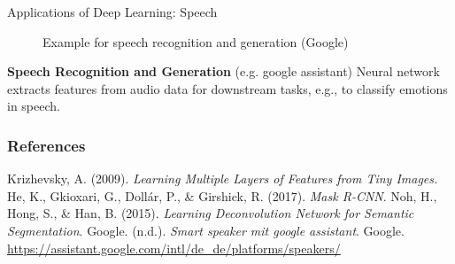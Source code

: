 \documentclass[11pt,compress,t,notes=noshow, xcolor=table]{beamer}
\begin{document}
\begin{frame} {Applications of Deep Learning: Speech}
\begin{figure}
\centering
{}
\caption{Example for speech recognition and generation (Google)}
\end{figure}
\textbf{Speech Recognition and Generation} (e.g. google assistant)
Neural network extracts features from audio data for downstream tasks, e.g., to classify emotions in speech.
\end{frame}

\begin{vbframe}
\frametitle{References}
\footnotesize{
\begin{thebibliography}{99}
Krizhevsky, A. (2009). \textit{Learning Multiple Layers of Features from Tiny Images.}
He, K., Gkioxari, G., Dollár, P., \& Girshick, R. (2017). \textit{Mask R-CNN}.
Noh, H., Hong, S., \& Han, B. (2015). \textit{Learning Deconvolution Network for Semantic Segmentation}.
Google. (n.d.). \textit{Smart speaker mit google assistant}. Google. \url{https://assistant.google.com/intl/de_de/platforms/speakers/}
\end{thebibliography}
}
\end{vbframe}


\endlecture
\end{document}
